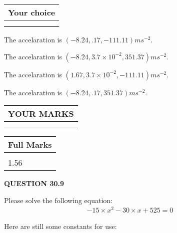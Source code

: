 \documentclass[12pt]{article}
\begin{document}
  
\noindent\hspace{3.0in} \begin{tabular}{|l|}
\hline
Your choice \\
\hline
 \\ 
 \\ 
\hline
\end{tabular}
  
  
 
 
  The accelaration is $  %
(
-8.24,
.17,
-111.11)
ms^{-2} $.
 
 
  The accelaration is $  %
(
-8.24,
3.7 \times 10^{-2},
351.37)
ms^{-2} $.
 
 
  The accelaration is $  %
(
1.67,
3.7 \times 10^{-2},
-111.11)
ms^{-2} $.
 
 
  The accelaration is $  %
(
-8.24,
.17,
351.37)
ms^{-2} $.
 
 
 

 
 
\vspace{0.3in}
  
\vspace{0.2in}
  
\noindent\begin{tabular}{|l|}
\hline
 YOUR MARKS  \\
\hline
 \\ 
 \\ 
\hline
\end{tabular}
\hspace{0.05in} \begin{tabular}{|l|}
\hline
 Full Marks  \\
\hline
 \\ 
1.56 \\
\hline
\end{tabular}
{\textbf{\Large{QUESTION
30.9 
}}}
  
  
 
 

 
Please solve the following equation:
\begin{eqnarray*}
-15 \times x^2  %
-30
                 \times x    %
+  %
525 =0
\end{eqnarray*}
 

 

 
\vspace{0.3in}
   
   
 \vspace{0.2in}
Here are still some constants for use:
 
\end{document}

